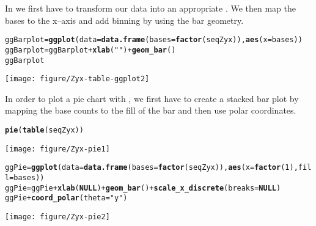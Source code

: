 \documentclass{article}\usepackage[]{graphicx}\usepackage[usenames,dvipsnames]{color}
\makeatletter
\def\maxwidth{ %
  \ifdim\Gin@nat@width>\linewidth
    \linewidth
  \else
    \Gin@nat@width
  \fi
}
\newcommand{\hlnum}[1]{\textcolor[rgb]{0.686,0.059,0.569}{#1}}%
\newcommand{\hlstr}[1]{\textcolor[rgb]{0.192,0.494,0.8}{#1}}%
\newcommand{\hlopt}[1]{\textcolor[rgb]{0,0,0}{#1}}%
\newcommand{\hlstd}[1]{\textcolor[rgb]{0.345,0.345,0.345}{#1}}%
\newcommand{\hlkwa}[1]{\textcolor[rgb]{0.161,0.373,0.58}{\textbf{#1}}}%
\newcommand{\hlkwb}[1]{\textcolor[rgb]{0.69,0.353,0.396}{#1}}%
\newcommand{\hlkwc}[1]{\textcolor[rgb]{0.333,0.667,0.333}{#1}}%
\newcommand{\hlkwd}[1]{\textcolor[rgb]{0.737,0.353,0.396}{\textbf{#1}}}%
\newenvironment{kframe}{%
 \def\at@end@of@kframe{}%
 \ifinner\ifhmode%
  \def\at@end@of@kframe{\end{minipage}}%
  \begin{minipage}{\columnwidth}%
 \fi\fi%
 \def\FrameCommand##1{\hskip\@totalleftmargin \hskip-\fboxsep
 \colorbox{shadecolor}{##1}\hskip-\fboxsep
     \hskip-\linewidth \hskip-\@totalleftmargin \hskip\columnwidth}%
 \MakeFramed {\advance\hsize-\width
   \@totalleftmargin\z@ \linewidth\hsize
   \@setminipage}}%
 {\par\unskip\endMakeFramed%
 \at@end@of@kframe}
\newenvironment{knitrout}{}{} %
\makeatother
\begin{document}
In  we first have to transform our data into an
appropriate . We then map the bases to 
the x--axis and add binning by using the bar geometry.

\begin{knitrout}
\color{fgcolor}\begin{kframe}
\begin{alltt}
\hlstd{ggBarplot} \hlkwb{=} \hlkwd{ggplot}\hlstd{(} \hlkwc{data} \hlstd{=} \hlkwd{data.frame}\hlstd{(}\hlkwc{bases} \hlstd{=} \hlkwd{factor}\hlstd{(seqZyx)),} \hlkwd{aes}\hlstd{(}\hlkwc{x} \hlstd{= bases))}
\hlstd{ggBarplot} \hlkwb{=} \hlstd{ggBarplot} \hlopt{+} \hlkwd{xlab}\hlstd{(}\hlstr{""}\hlstd{)} \hlopt{+} \hlkwd{geom_bar}\hlstd{()}
\hlstd{ggBarplot}
\end{alltt}
\end{kframe}
\texttt{[image: figure/Zyx-table-ggplot2]} 

\end{knitrout}
%

In order to plot a pie chart with , we first have 
to create a stacked bar plot by  mapping the base counts to the fill 
of the bar and then use polar coordinates.

\begin{knitrout}
\color{fgcolor}\begin{kframe}
\begin{alltt}
\hlkwd{pie}\hlstd{(}\hlkwd{table}\hlstd{(seqZyx))}
\end{alltt}
\end{kframe}
\texttt{[image: figure/Zyx-pie1]} 
\begin{kframe}\begin{alltt}
\hlstd{ggPie} \hlkwb{=} \hlkwd{ggplot}\hlstd{(} \hlkwc{data} \hlstd{=} \hlkwd{data.frame}\hlstd{(}\hlkwc{bases} \hlstd{=} \hlkwd{factor}\hlstd{(seqZyx)),} \hlkwd{aes}\hlstd{(}\hlkwc{x} \hlstd{=} \hlkwd{factor}\hlstd{(}\hlnum{1}\hlstd{),}  \hlkwc{fill} \hlstd{= bases))}
\hlstd{ggPie} \hlkwb{=} \hlstd{ggPie} \hlopt{+} \hlkwd{xlab}\hlstd{(}\hlkwa{NULL}\hlstd{)} \hlopt{+} \hlkwd{geom_bar}\hlstd{()} \hlopt{+} \hlkwd{scale_x_discrete}\hlstd{(}\hlkwc{breaks}\hlstd{=}\hlkwa{NULL}\hlstd{)}
\hlstd{ggPie} \hlopt{+} \hlkwd{coord_polar}\hlstd{(}\hlkwc{theta} \hlstd{=} \hlstr{"y"}\hlstd{)}
\end{alltt}
\end{kframe}
\texttt{[image: figure/Zyx-pie2]} 

\end{knitrout}
%
\end{document}
